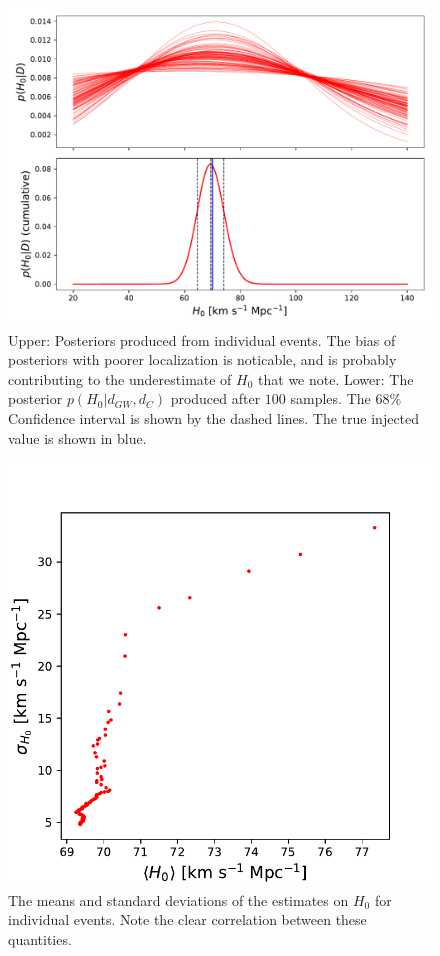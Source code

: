 \begin{figure}
    \centering
    \includegraphics[width=1.5\columnwidth]{figures/posterior.pdf}
    \caption{Upper: Posteriors produced from individual events. The bias of posteriors with poorer localization is noticable, and is probably contributing to the underestimate of $H_0$ that we note. Lower: The posterior $p(H_0 | d_{GW}, d_C)$ produced after $100$ samples. The $68\%$ Confidence interval is shown by the dashed lines. The true injected value is shown in blue.}
    \label{fig:posterior}
\end{figure}

\begin{figure}
    \centering
    \includegraphics[width=0.95\columnwidth]{figures/correlation.pdf}
    \caption{The means and standard deviations of the estimates on $H_0$ for individual events. Note the clear correlation between these quantities.}
    \label{fig:correlation}
\end{figure}

